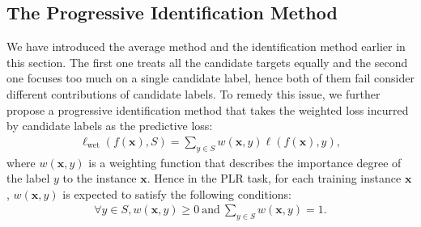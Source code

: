 \documentclass[letterpaper]{article} %
\begin{document}
\subsection{The Progressive Identification Method}
We have introduced the average method and the identification method earlier in this section. The first one treats all the candidate targets equally and the second one focuses too much on a single candidate label, hence both of them fail consider different contributions of candidate labels. To remedy this issue, we further propose a progressive identification method that takes the weighted loss incurred by candidate labels as the predictive loss:
\begin{gather}
\nonumber
\ell_{\mathrm{wet}}(f(\bm{x}), S) = \sum\nolimits_{y\in S}w(\bm{x},y)\ell(f(\bm{x}),y),
\end{gather}
where $w(\bm{x},y)$ is a weighting function that describes the importance degree of the label $y$ to the instance $\bm{x}$. Hence in the PLR task, for each training instance $\bm{x}$, $w(\bm{x},y)$ is expected to satisfy the following conditions:
\begin{gather}
\label{candidate_constraint}
\forall y\in S, w(\bm{x},{y})\geq 0\ \mathrm{and}\
\sum\nolimits_{y\in S} w(\bm{x},y)=1.
\end{gather}
\end{document}
